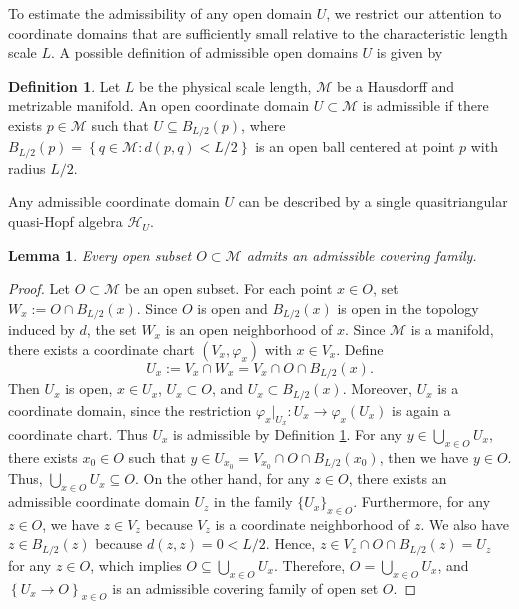 \documentclass[reqno]{amsart}
\newtheorem{lemma}[formula]{Lemma}
\theoremstyle{definition}
\newtheorem{definition}[formula]{Definition}
\theoremstyle{remark}
\begin{document}
To estimate the admissibility of any open domain $U$, we restrict our attention to coordinate domains that are sufficiently small relative to the characteristic length scale $L$. A possible definition of admissible open domains $U$ is given by
\begin{definition}\label{def:admissible}
    Let $L$ be the physical scale length, $\mathcal{M}$ be a Hausdorff and metrizable manifold. An open coordinate domain $U \subset \mathcal{M}$ is admissible if there exists $p \in \mathcal{M}$ such that $U  \subseteq B_{L/2}(p)$, where $B_{L/2}(p)=\left\{q\in \mathcal{M}:d(p,q)<L/2\right\}$ is an open ball centered at point $p$ with radius $L/2$.
\end{definition}
Any admissible coordinate domain $U$ can be described by a single quasitriangular quasi-Hopf algebra $\mathscr{H}_U$.

\begin{lemma}
Every open subset $O\subset \mathcal M$ admits an admissible covering family.
\end{lemma}

\begin{proof}
Let $O\subset \mathcal M$ be an open subset. For each point $x\in O$, set $W_x:=O\cap B_{L/2}(x)$. Since $O$ is open and $B_{L/2}(x)$ is open in the topology induced by $d$, the set $W_x$ is an open neighborhood of $x$. Since $\mathcal M$ is a manifold, there exists a coordinate chart $(V_x,\varphi_x)$ with $x\in V_x$. Define
\begin{equation}
    U_x:=V_x\cap W_x=V_x\cap O\cap B_{L/2}(x).
\end{equation}
Then $U_x$ is open, $x\in U_x$, $U_x\subset O$, and $U_x\subset B_{L/2}(x)$. Moreover, $U_x$ is a coordinate domain, since the restriction $\varphi_x|_{U_x}:U_x\to \varphi_x(U_x)$ is again a coordinate chart. Thus $U_x$ is admissible by Definition \ref{def:admissible}. For any $y\in \bigcup\limits_{x\in O} U_x$, there exists $x_0 \in O$ such that $y\in U_{x_0}=V_{x_0}\cap O\cap B_{L/2}(x_0)$, then we have $y\in O$. Thus, $\bigcup\limits_{x\in O} U_x \subseteq  O$. On the other hand, for any $z\in O$, there exists an admissible coordinate domain $U_z$ in the family $\{U_x\}_{x\in O}$. Furthermore, for any $z \in O$, we have $z \in V_z$ because $V_z$ is a coordinate neighborhood of $z$. We also have $z \in B_{L/2}(z)$ because $d(z,z)=0<L/2$. Hence, $z \in V_z \cap O\cap B_{L/2}(z)=U_z$ for any $z\in O$, which implies $O \subseteq \bigcup\limits_{x\in O} U_x$. Therefore, $O=\bigcup\limits_{x\in O} U_x$, and $\left\{U_x \longrightarrow O\right\}_{x\in O}$ is an admissible covering family of open set $O$. 




\end{proof}
\end{document}
